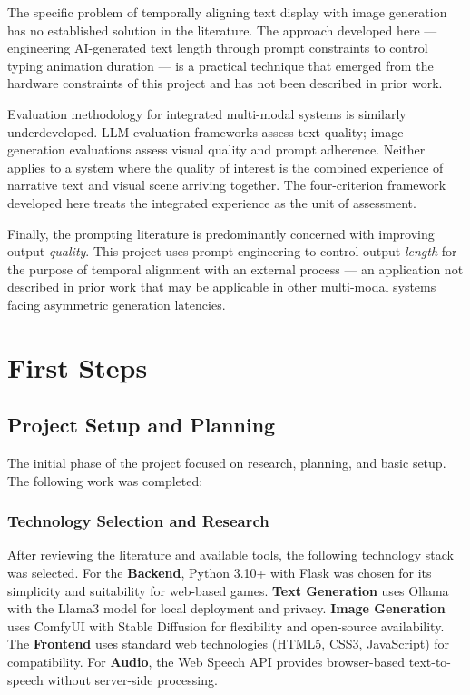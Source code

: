 \documentclass[12pt,a4paper]{article}
\begin{document}
The specific problem of temporally aligning text display with image generation has no established solution in the literature. The approach developed here --- engineering AI-generated text length through prompt constraints to control typing animation duration --- is a practical technique that emerged from the hardware constraints of this project and has not been described in prior work.

Evaluation methodology for integrated multi-modal systems is similarly underdeveloped. LLM evaluation frameworks assess text quality; image generation evaluations assess visual quality and prompt adherence. Neither applies to a system where the quality of interest is the combined experience of narrative text and visual scene arriving together. The four-criterion framework developed here treats the integrated experience as the unit of assessment.

Finally, the prompting literature is predominantly concerned with improving output \emph{quality}. This project uses prompt engineering to control output \emph{length} for the purpose of temporal alignment with an external process --- an application not described in prior work that may be applicable in other multi-modal systems facing asymmetric generation latencies.

    \section{First Steps}

    \subsection{Project Setup and Planning}

The initial phase of the project focused on research, planning, and basic setup. The following work was completed:

    \subsubsection{Technology Selection and Research}

After reviewing the literature and available tools, the following technology stack was selected. For the \textbf{Backend}, Python 3.10+ with Flask was chosen for its simplicity and suitability for web-based games. \textbf{Text Generation} uses Ollama with the Llama3 model for local deployment and privacy. \textbf{Image Generation} uses ComfyUI with Stable Diffusion for flexibility and open-source availability. The \textbf{Frontend} uses standard web technologies (HTML5, CSS3, JavaScript) for compatibility. For \textbf{Audio}, the Web Speech API provides browser-based text-to-speech without server-side processing.
\end{document}

